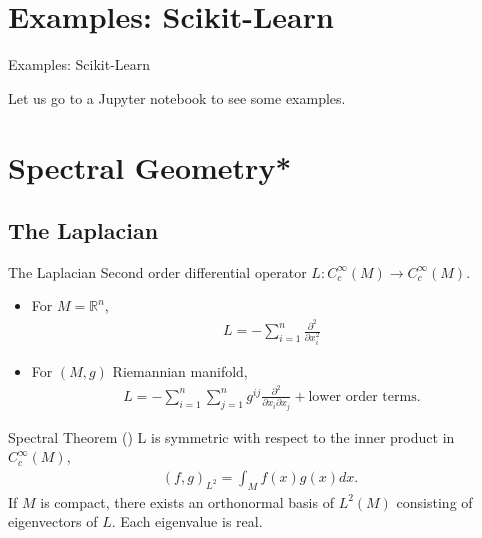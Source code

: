 \documentclass[11pt]{beamer}
\begin{document}
\section{Examples: Scikit-Learn}


\begin{frame}{Examples: Scikit-Learn}

Let us go to a Jupyter notebook to see some examples.

\end{frame}

\section{Spectral Geometry*}

\subsection{The Laplacian}

\begin{frame}{The Laplacian}
Second order differential operator  
$L:C_c^\infty(M)\longrightarrow C_c^\infty(M)$.
\begin{itemize}
\item For $M = \mathbb{R}^n$,  
\begin{align*}
L = -\sum_{i=1}^n \frac{\partial^2}{\partial x_i^2}
\end{align*}
\item For $(M, g)$ Riemannian manifold, 
\begin{align*}
L = - \sum_{i=1}^n\sum_{j=1}^n g^{ij}\frac{\partial^2}{\partial x_i \partial x_j} + \text{lower order terms}.
\end{align*}
\pause
\end{itemize}
\begin{block}{Spectral Theorem (\cite{R1997})}
L is symmetric with respect to the inner product in $C^\infty_c(M)$,
\begin{align*}
(f,g)_{L^2} = \int_M f(x)g(x)  dx.
\end{align*}
If $M$ is compact, there exists an orthonormal basis of $L^2(M)$ consisting of eigenvectors of $L$. Each eigenvalue is real.
\end{block}
\end{frame}
\end{document}
